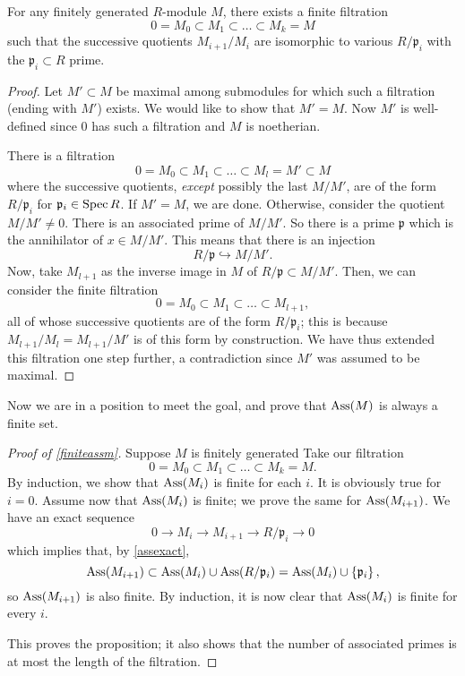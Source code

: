 \begin{proposition} \label{filtrationlemma}
For any finitely generated $R$-module $M$, there exists a finite filtration
\[ 0 = M_0 \subset M_1 \subset \dots \subset M_k = M  \]
such that the successive quotients $M_{i+1}/M_i$ are isomorphic to various
$R/\mathfrak{p}_i$ with the $\mathfrak{p}_i \subset R$ prime.
\end{proposition} 
\begin{proof} 
Let $M' \subset M$ be maximal among submodules for which such a filtration
(ending with $M'$)
exists. We would like to show that $M' = M$.  Now $M'$ is well-defined since
$0$ has such a filtration and $M$ is
noetherian.  

There is a filtration
\[ 0 = M_0 \subset M_1 \subset \dots \subset M_l = M' \subset M  \]
where the successive quotients, \emph{except} possibly the last $M/M'$, are of
the form $R/\mathfrak{p}_i $ for $\mathfrak{p}_i \in \operatorname{Spec} R$.
If $M' = M$, we are done. Otherwise, consider
the quotient $M/M' \neq 0$. There is an associated prime of $M/M'$. So there is
a prime $\mathfrak{p}$ which is the annihilator of $x \in M/M'$. This means
that there is an injection 
\[ R/\mathfrak{p} \hookrightarrow M/M'.  \]
Now, take $M_{l+1}$ as the inverse image in $M$
of $R/\mathfrak{p} \subset M/M'$. 
Then, we can consider the finite filtration
\[ 0 = M_0 \subset M_1 \subset \dots \subset M_{l+1} , \]
all of whose successive quotients are of the form $R/\mathfrak{p}_i$; this is
because $M_{l+1}/M_l = M_{l+1}/M'$ is of this form by construction.
We have thus extended this filtration one
step further,  a contradiction since
$M'$ was assumed to be maximal.
\end{proof} 

Now we are in a position to meet the goal, and prove that $\operatorname{Ass}(M)$ is
always a finite set. 
\begin{proof}[Proof of \cref{finiteassm}]
Suppose $M$ is finitely generated Take our filtration
\[ 0 = M_0 \subset M_1 \subset \dots \subset M_k = M.  \]
By induction, we show that $\operatorname{Ass}(M_i)$ is finite for each $i$. It is obviously
true for $i=0$. Assume now that $\operatorname{Ass}(M_i)$ is finite; we prove the same for
$\operatorname{Ass}(M_{i+1})$. We have an exact sequence
\[ 0 \to M_i \to M_{i+1} \to R/\mathfrak{p}_i \to 0  \]
which implies that, by \cref{assexact},
\[ \operatorname{Ass}(M_{i+1}) \subset \operatorname{Ass}(M_i) \cup \operatorname{Ass}(R/\mathfrak{p}_i) = \operatorname{Ass}(M_i)
\cup \left\{\mathfrak{p}_i\right\} , \]
so $\operatorname{Ass}(M_{i+1})$ is also finite.
By induction, it is now clear that $\operatorname{Ass}(M_i)$ is finite for every $i$.

This proves the proposition; it also shows that the number of
associated primes is at most the length of the filtration. 
\end{proof} 

